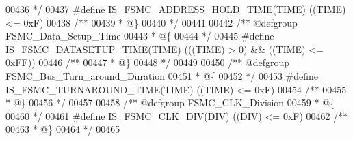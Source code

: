 \begin{DoxyCode}
00436 \textcolor{comment}{  */}
00437 \textcolor{preprocessor}{#}\textcolor{preprocessor}{define} \textcolor{preprocessor}{IS\_FSMC\_ADDRESS\_HOLD\_TIME}\textcolor{preprocessor}{(}\textcolor{preprocessor}{TIME}\textcolor{preprocessor}{)} \textcolor{preprocessor}{(}\textcolor{preprocessor}{(}\textcolor{preprocessor}{TIME}\textcolor{preprocessor}{)} \textcolor{preprocessor}{<=} 0xF\textcolor{preprocessor}{)}
00438 \textcolor{comment}{/**}
00439 \textcolor{comment}{  * @\}}
00440 \textcolor{comment}{  */}
00441 
00442 \textcolor{comment}{/** @defgroup FSMC\_Data\_Setup\_Time }
00443 \textcolor{comment}{  * @\{}
00444 \textcolor{comment}{  */}
00445 \textcolor{preprocessor}{#}\textcolor{preprocessor}{define} \textcolor{preprocessor}{IS\_FSMC\_DATASETUP\_TIME}\textcolor{preprocessor}{(}\textcolor{preprocessor}{TIME}\textcolor{preprocessor}{)} \textcolor{preprocessor}{(}\textcolor{preprocessor}{(}\textcolor{preprocessor}{(}\textcolor{preprocessor}{TIME}\textcolor{preprocessor}{)} \textcolor{preprocessor}{>} 0\textcolor{preprocessor}{)} \textcolor{preprocessor}{&&} \textcolor{preprocessor}{(}\textcolor{preprocessor}{(}\textcolor{preprocessor}{TIME}\textcolor{preprocessor}{)} \textcolor{preprocessor}{<=} 0xFF\textcolor{preprocessor}{)}\textcolor{preprocessor}{)}
00446 \textcolor{comment}{/**}
00447 \textcolor{comment}{  * @\}}
00448 \textcolor{comment}{  */}
00449 
00450 \textcolor{comment}{/** @defgroup FSMC\_Bus\_Turn\_around\_Duration }
00451 \textcolor{comment}{  * @\{}
00452 \textcolor{comment}{  */}
00453 \textcolor{preprocessor}{#}\textcolor{preprocessor}{define} \textcolor{preprocessor}{IS\_FSMC\_TURNAROUND\_TIME}\textcolor{preprocessor}{(}\textcolor{preprocessor}{TIME}\textcolor{preprocessor}{)} \textcolor{preprocessor}{(}\textcolor{preprocessor}{(}\textcolor{preprocessor}{TIME}\textcolor{preprocessor}{)} \textcolor{preprocessor}{<=} 0xF\textcolor{preprocessor}{)}
00454 \textcolor{comment}{/**}
00455 \textcolor{comment}{  * @\}}
00456 \textcolor{comment}{  */}
00457 
00458 \textcolor{comment}{/** @defgroup FSMC\_CLK\_Division }
00459 \textcolor{comment}{  * @\{}
00460 \textcolor{comment}{  */}
00461 \textcolor{preprocessor}{#}\textcolor{preprocessor}{define} \textcolor{preprocessor}{IS\_FSMC\_CLK\_DIV}\textcolor{preprocessor}{(}\textcolor{preprocessor}{DIV}\textcolor{preprocessor}{)} \textcolor{preprocessor}{(}\textcolor{preprocessor}{(}\textcolor{preprocessor}{DIV}\textcolor{preprocessor}{)} \textcolor{preprocessor}{<=} 0xF\textcolor{preprocessor}{)}
00462 \textcolor{comment}{/**}
00463 \textcolor{comment}{  * @\}}
00464 \textcolor{comment}{  */}
00465 

\end{DoxyCode}
